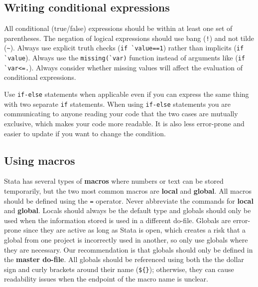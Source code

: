 
\subsection{Writing conditional expressions}

All conditional (true/false) expressions should be within at least one set of parentheses.
The negation of logical expressions should use bang (\texttt{!}) and not tilde (\texttt{\~}).
Always use explicit truth checks (\texttt{if \`{}value\textquotesingle==1})
rather than implicits (\texttt{if \`{}value\textquotesingle}).
Always use the \texttt{missing(\`{}var\textquotesingle)} function
instead of arguments like (\texttt{if \`{}var\textquotesingle<=.}).
Always consider whether missing values will affect the evaluation of conditional expressions.


\noindent Use \texttt{if-else} statements when applicable
even if you can express the same thing with two separate \texttt{if} statements.
When using \texttt{if-else} statements you are communicating to anyone reading your code
that the two cases are mutually exclusive, which makes your code more readable.
It is also less error-prone and easier to update if you want to change the condition.


\subsection{Using macros}

Stata has several types of \textbf{macros} where numbers or text can be stored temporarily,
but the two most common macros are \textbf{local} and \textbf{global}.
All macros should be defined using the \texttt{=} operator.
Never abbreviate the commands for \textbf{local} and \textbf{global}.
Locals should always be the default type and globals should only
be used when the information stored is used in a different do-file.
Globals are error-prone since they are active as long as Stata is open,
which creates a risk that a global from one project is incorrectly used in another,
so only use globals where they are necessary.
Our recommendation is that globals should only be defined in the \textbf{master do-file}.
All globals should be referenced using both the the dollar sign and curly brackets around their name (\texttt{\$\{\}});
otherwise, they can cause readability issues when the endpoint of the macro name is unclear.

